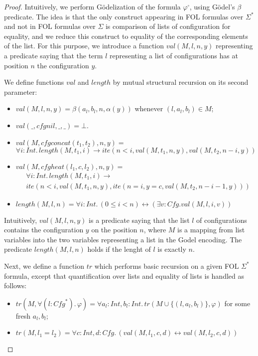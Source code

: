 \begin{proof}
Intuitively, we perform Gödelization of the formula $\varphi^\square$, using Gödel's $\beta$ predicate.
The idea is that the only construct appearing in FOL formulas over $\Sigma^*$ and not in FOL formulas over $\Sigma$
is comparison of lists of configuration for equality, and we reduce this construct to equality of the corresponding
elements of the list.
For this purpose, we introduce a function $\mathit{val}(M, l, n, y)$ representing a predicate saying that
the term $l$ representing a list of configurations has at position $n$ the configuration $y$.

We define functions $\mathit{val}$ and $\mathit{length}$ by mutual structural recursion on its second parameter:
\begin{itemize}
    \item $\mathit{val}(M, l, n, y) = \beta(a_{l}, b_{l}, n, \alpha(y))$ whenever $(l, a_{l}, b_{l}) \in M$;
    \item $\mathit{val}(\_, \mathit{cfgnil}, \_, \_) = \bot$.
    \item $\mathit{val}(M, \mathit{cfgconcat}(t_1, t_2), n, y) =$ \\
    $\forall i:\mathit{Int}. \, \mathit{length}(M, t_1, i) \rightarrow \mathit{ite}(n < i, \mathit{val}(M, t_1, n, y), \mathit{val}(M, t_2, n-i, y))$
    \item $\mathit{val}(M, \mathit{cfgheat}(l_1, c, l_2), n, y) =$
    \begin{align*}
        & \forall i:\mathit{Int}. \, \mathit{length}(M, t_1, i) \rightarrow \\
        & \mathit{ite}(n < i, \mathit{val}(M, t_1, n, y), \mathit{ite}(n = i, y = c, \mathit{val}(M, t_2, n-i-1, y)))
    \end{align*}    
    \item $\mathit{length}(M, l, n) = \forall i:\mathit{Int}.\, (0 \leq i < n) \leftrightarrow (\exists v : \mathit{Cfg}. \mathit{val}(M, l, i, v))$
\end{itemize}
Intuitively, $\mathit{val}(M, l, n, y)$ is a predicate saying that the list $l$ of configurations
contains the configuration $y$ on the position $n$,
where $M$ is a mapping from list variables into the two variables representing a list in the Godel encoding.
The predicate $\mathit{length}(M, l, n)$ holds if the lenght of $l$ is exactly $n$.


Next, we define a function $\mathit{tr}$ which performs basic recursion on a given FOL $\Sigma^*$ formula,
except that quantification over lists and equality of lists is handled as follows:
\begin{itemize}
    \item $\mathit{tr}(M, \forall (l : \mathit{Cfg}^*).\, \varphi) = \forall a_l : \mathit{Int}, b_l : \mathit{Int}.\, \mathit{tr}(M \cup \{ (l, a_l, b_l) \}, \varphi)$
    for some fresh $a_l,b_l$;
    \item $\mathit{tr}(M, l_1 = l_2) = \forall c : \mathit{Int}, d:\mathit{Cfg}.\, ( \mathit{val}(M, l_1, c, d) \leftrightarrow \mathit{val}(M, l_2, c, d))$
\end{itemize}


\end{proof}

